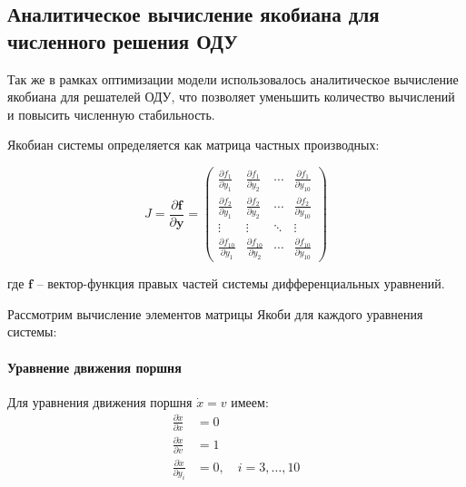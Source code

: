 \subsection{Аналитическое вычисление якобиана для численного решения ОДУ}\label{sec:ch2/sec5/subsec3}
Так же в рамках оптимизации модели использовалось аналитическое вычисление якобиана для
решателей ОДУ, что позволяет уменьшить количество вычислений и повысить численную стабильность.

Якобиан системы определяется как матрица частных производных:

\begin{equation}\label{eq:ch2/jacobian_matrix}
    J = \frac{\partial \mathbf{f}}{\partial \mathbf{y}} =
    \begin{pmatrix}
        \frac{\partial f_1}{\partial y_1}    & \frac{\partial f_1}{\partial y_2}    & \cdots & \frac{\partial f_1}{\partial y_{10}}    \\
        \frac{\partial f_2}{\partial y_1}    & \frac{\partial f_2}{\partial y_2}    & \cdots & \frac{\partial f_2}{\partial y_{10}}    \\
        \vdots                               & \vdots                               & \ddots & \vdots                                  \\
        \frac{\partial f_{10}}{\partial y_1} & \frac{\partial f_{10}}{\partial y_2} & \cdots & \frac{\partial f_{10}}{\partial y_{10}}
    \end{pmatrix}
\end{equation}

где $\mathbf{f}$ -- вектор-функция правых частей системы дифференциальных уравнений.


Рассмотрим вычисление элементов матрицы Якоби для каждого уравнения системы:

\paragraph{Уравнение движения поршня}
Для уравнения движения поршня $\dot{x} = v$ имеем:
\begin{equation}\label{eq:ch2/jacobian_motion}
    \begin{aligned}
        \frac{\partial \dot{x}}{\partial x}   & = 0                          \\
        \frac{\partial \dot{x}}{\partial v}   & = 1                          \\
        \frac{\partial \dot{x}}{\partial y_i} & = 0, \quad i = 3, \ldots, 10
    \end{aligned}
\end{equation}


